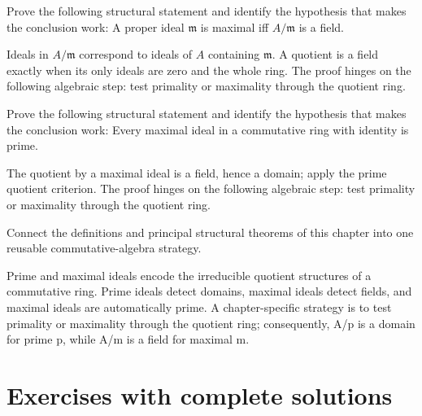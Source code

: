 \begin{problem}\label{prob:v02-problem-10}
Prove the following structural statement and identify the hypothesis that makes the conclusion work: A proper ideal $\mathfrak m$ is maximal iff $A/\mathfrak m$ is a field.
\end{problem}
\begin{solution}
Ideals in $A/\mathfrak m$ correspond to ideals of $A$ containing $\mathfrak m$. A quotient is a field exactly when its only ideals are zero and the whole ring. The proof hinges on the following algebraic step: test primality or maximality through the quotient ring.
\end{solution}

\begin{problem}\label{prob:v02-problem-11}
Prove the following structural statement and identify the hypothesis that makes the conclusion work: Every maximal ideal in a commutative ring with identity is prime.
\end{problem}
\begin{solution}
The quotient by a maximal ideal is a field, hence a domain; apply the prime quotient criterion. The proof hinges on the following algebraic step: test primality or maximality through the quotient ring.
\end{solution}

\begin{problem}\label{prob:v02-problem-12}
Connect the definitions and principal structural theorems of this chapter into one reusable commutative-algebra strategy.
\end{problem}
\begin{solution}
Prime and maximal ideals encode the irreducible quotient structures of a commutative ring. Prime ideals detect domains, maximal ideals detect fields, and maximal ideals are automatically prime. A chapter-specific strategy is to test primality or maximality through the quotient ring; consequently, A/p is a domain for prime p, while A/m is a field for maximal m.
\end{solution}

\section{Exercises with complete solutions}

